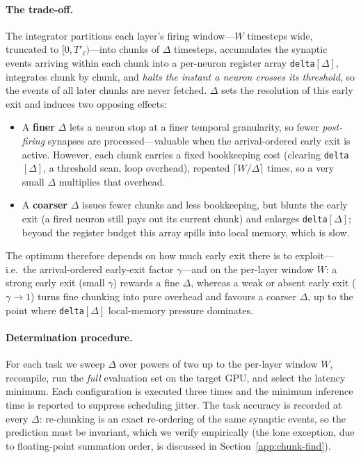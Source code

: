\documentclass[runningheads]{llncs}
\begin{document}
\paragraph{The trade-off.}
The integrator partitions each layer's firing window---$W$ timesteps wide,
truncated to $[0,T'_\ell)$---into chunks of
$\Delta$ timesteps, accumulates the synaptic events arriving within each chunk
into a per-neuron register array \texttt{delta}$[\Delta]$, integrates chunk by
chunk, and \emph{halts the instant a neuron crosses its threshold}, so the events
of all later chunks are never fetched. $\Delta$ sets the resolution of this early
exit and induces two opposing effects:
\begin{itemize}
  \item A \textbf{finer} $\Delta$ lets a neuron stop at a finer temporal
    granularity, so fewer \emph{post-firing} synapses are processed---valuable
    when the arrival-ordered early exit is active. However, each chunk carries a
    fixed bookkeeping cost (clearing \texttt{delta}$[\Delta]$, a threshold scan,
    loop overhead), repeated $\lceil W/\Delta\rceil$ times, so a very small
    $\Delta$ multiplies that overhead.
  \item A \textbf{coarser} $\Delta$ issues fewer chunks and less bookkeeping, but
    blunts the early exit (a fired neuron still pays out its current chunk) and
    enlarges \texttt{delta}$[\Delta]$; beyond the register budget this array
    spills into local memory, which is slow.
\end{itemize}
The optimum therefore depends on how much early exit there is to exploit---i.e.\
the arrival-ordered early-exit factor $\gamma$---and on the per-layer window $W$:
a strong early exit (small $\gamma$) rewards a fine $\Delta$, whereas a weak or
absent early exit ($\gamma\!\to\!1$) turns fine chunking into pure overhead and
favours a coarser $\Delta$, up to the point where \texttt{delta}$[\Delta]$
local-memory pressure dominates.

\paragraph{Determination procedure.}
For each task we sweep $\Delta$ over powers of two up to the per-layer window $W$,
recompile, run the \emph{full} evaluation set on the target GPU, and select the
latency minimum. Each configuration is executed three times and the minimum
inference time is reported to suppress scheduling jitter. The task accuracy is
recorded at every $\Delta$: re-chunking is an exact re-ordering of the same
synaptic events, so the prediction must be invariant, which we verify empirically
(the lone exception, due to floating-point summation order, is discussed in
Section~\ref{app:chunk-find}).
\end{document}
